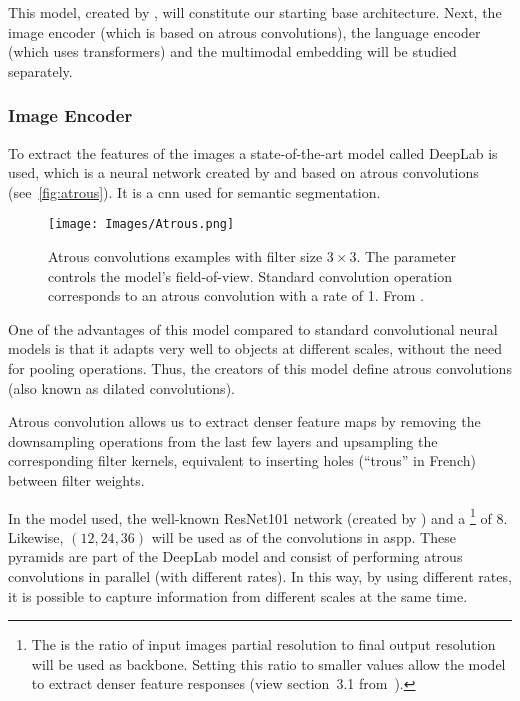 This model, created by , will constitute our starting
base architecture. Next, the image encoder (which is based on atrous
convolutions), the language encoder (which uses transformers) and the
multimodal embedding will be studied separately.

\subsubsection{Image Encoder}

To extract the features of the images a state-of-the-art model called DeepLab
is used, which is a neural network created by  and based
on atrous convolutions (see\ \vref{fig:atrous}). It is a \gls{cnn} used for
semantic segmentation.

\begin{figure}[ht]
  \centering
  \texttt{[image: Images/Atrous.png]}
  \caption[Atrous convolutions examples]{Atrous convolutions examples with
    filter size \(3 \times 3\). The  parameter controls the model's
    field-of-view. Standard convolution operation corresponds to an atrous
    convolution with a rate of 1. From .}%
  \label{fig:atrous}
\end{figure}

One of the advantages of this model compared to standard convolutional neural
models is that it adapts very well to objects at different scales, without the
need for pooling operations. Thus, the creators of this model define atrous
convolutions (also known as dilated convolutions).

\begin{quoteBox}
  Atrous convolution allows us to extract denser feature maps by removing the
  downsampling operations from the last few layers and upsampling the
  corresponding filter kernels, equivalent to inserting holes (``trous'' in
  French) between filter weights.
  \tcblower{}
\end{quoteBox}

In the model used, the well-known ResNet101 network (created by
) and a \footnote{The
   is the ratio of input images partial resolution to
  final output resolution will be used as backbone. Setting this ratio to
  smaller values allow the model to extract denser feature responses (view
  section~3.1 from~\cite{chen17:rethin}).} of 8. Likewise, \((12, 24, 36)\)
will be used as  of the convolutions in \gls{aspp}. These pyramids
are part of the DeepLab model and consist of performing atrous convolutions in
parallel (with different rates). In this way, by using different rates, it is
possible to capture information from different scales at the same time.


